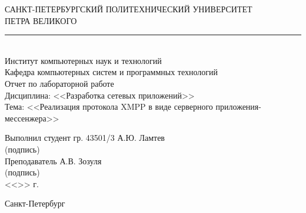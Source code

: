 \begin{titlepage}
\begin{center}
	САНКТ-ПЕТЕРБУРГСКИЙ ПОЛИТЕХНИЧЕСКИЙ УНИВЕРСИТЕТ\\ ПЕТРА ВЕЛИКОГО\\[0.3cm]
	\par\noindent\rule{10cm}{0.4pt}\\[0.3cm]
	Институт компьютерных наук и технологий \\[0.3cm]
	Кафедра компьютерных систем и программных технологий\\[4cm]
	
	Отчет по лабораторной работе\\[3mm]
	Дисциплина: <<Разработка сетевых приложений>>\\[3mm]
	Тема: <<Реализация протокола XMPP в виде серверного приложения-мессенжера>>\\[7cm]
\end{center}

\begin{flushleft}
	\hspace*{5mm} Выполнил студент гр. 43501/3  \hspace*{2.5cm}\sign[3cm]\hfill А.Ю. Ламтев\\
	\hspace*{10.4cm} (подпись)\\[3mm]
	\hspace*{5mm} Преподаватель \hspace*{6.0cm}\sign[3cm]\hfill А.В. Зозуля\\
	\hspace*{10.4cm} (подпись)\\[3mm]
	\hspace*{11.1cm} <<\sign[7mm]>> \sign[27mm] \the\year\hspace{1mm} г.
\end{flushleft}

\vfill

\begin{center}
	Санкт-Петербург\\
	\the\year
\end{center}
\end{titlepage}
\addtocounter{page}{1}